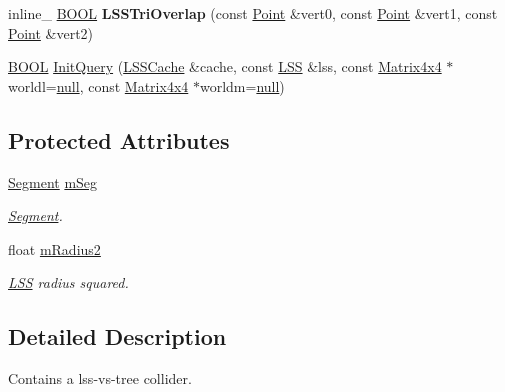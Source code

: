 \begin{DoxyCompactItemize}
\item 
\hypertarget{class_l_s_s_collider_a37ef7f5a00044832d671e74689648b5b}{inline\+\_\+ \hyperlink{_ice_types_8h_a050c65e107f0c828f856a231f4b4e788}{B\+O\+O\+L} {\bfseries L\+S\+S\+Tri\+Overlap} (const \hyperlink{class_point}{Point} \&vert0, const \hyperlink{class_point}{Point} \&vert1, const \hyperlink{class_point}{Point} \&vert2)}\label{class_l_s_s_collider_a37ef7f5a00044832d671e74689648b5b}

\item 
\hyperlink{_ice_types_8h_a050c65e107f0c828f856a231f4b4e788}{B\+O\+O\+L} \hyperlink{class_l_s_s_collider_ac417b949ffc2cf68563a305d6db61baa}{Init\+Query} (\hyperlink{struct_l_s_s_cache}{L\+S\+S\+Cache} \&cache, const \hyperlink{class_l_s_s}{L\+S\+S} \&lss, const \hyperlink{class_matrix4x4}{Matrix4x4} $\ast$worldl=\hyperlink{_ice_types_8h_ac97b8ee753e4405397a42ad5799b0f9e}{null}, const \hyperlink{class_matrix4x4}{Matrix4x4} $\ast$worldm=\hyperlink{_ice_types_8h_ac97b8ee753e4405397a42ad5799b0f9e}{null})
\end{DoxyCompactItemize}
\subsection*{Protected Attributes}
\begin{DoxyCompactItemize}
\item 
\hypertarget{class_l_s_s_collider_a644a06ae278436a8a540c4f49f13c73f}{\hyperlink{class_segment}{Segment} \hyperlink{class_l_s_s_collider_a644a06ae278436a8a540c4f49f13c73f}{m\+Seg}}\label{class_l_s_s_collider_a644a06ae278436a8a540c4f49f13c73f}

\begin{DoxyCompactList}\small\item\em \hyperlink{class_segment}{Segment}. \end{DoxyCompactList}\item 
\hypertarget{class_l_s_s_collider_a84f3909ea162922bc5778122b719831d}{float \hyperlink{class_l_s_s_collider_a84f3909ea162922bc5778122b719831d}{m\+Radius2}}\label{class_l_s_s_collider_a84f3909ea162922bc5778122b719831d}

\begin{DoxyCompactList}\small\item\em \hyperlink{class_l_s_s}{L\+S\+S} radius squared. \end{DoxyCompactList}\end{DoxyCompactItemize}


\subsection{Detailed Description}
Contains a lss-\/vs-\/tree collider.

